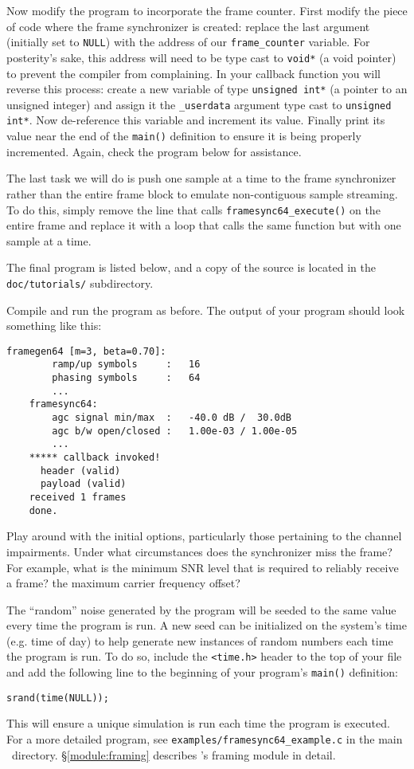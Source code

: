 Now modify the program to incorporate the frame counter.
First modify the piece of code where the frame synchronizer is created:
replace the last argument (initially set to {\tt NULL}) with the address
of our {\tt frame\_counter} variable.
For posterity's sake, this address will need to be type cast to
{\tt void*} (a void pointer) to prevent the compiler from complaining.
In your callback function you will reverse this process:
create a new variable of type {\tt unsigned int*}
(a pointer to an unsigned integer)
and assign it the {\tt \_userdata} argument type cast to
{\tt unsigned int*}.
Now de-reference this variable and increment its value.
Finally print its value near the end of the {\tt main()} definition to
ensure it is being properly incremented.
Again, check the program below for assistance.

The last task we will do is push one sample at a time to the frame
synchronizer rather than the entire frame block to emulate
non-contiguous sample streaming.
To do this, simply remove the line that calls
{\tt framesync64\_execute()} on the entire frame
and replace it with a loop that calls the same function but with one
sample at a time.

The final program is listed below,
and a copy of the source is located in the {\tt doc/tutorials/}
subdirectory.
%

%
Compile and run the program as before.
The output of your program should look something like this:
%
\begin{Verbatim}[fontsize=\small]
    framegen64 [m=3, beta=0.70]:
        ramp/up symbols     :   16
        phasing symbols     :   64
        ...
    framesync64:
        agc signal min/max  :   -40.0 dB /  30.0dB
        agc b/w open/closed :   1.00e-03 / 1.00e-05
        ...
    ***** callback invoked!
      header (valid)
      payload (valid)
    received 1 frames
    done.
\end{Verbatim}
%
Play around with the initial options, particularly those pertaining to
the channel impairments.
Under what circumstances does the synchronizer miss the frame?
For example, what is the minimum SNR level that is required to reliably
receive a frame?
the maximum carrier frequency offset?

The ``random'' noise generated by the program will be seeded to the same
value every time the program is run.
A new seed can be initialized on the system's time (e.g. time of day) to
help generate new instances of random numbers each time the program is
run.
To do so, include the {\tt <time.h>} header to the top of your file and
add the following line to the beginning of your program's {\tt main()}
definition:
%
\begin{Verbatim}[fontsize=\small]
    srand(time(NULL));
\end{Verbatim}
%
This will ensure a unique simulation is run each time the program is
executed.
For a more detailed program, see {\tt examples/framesync64\_example.c}
in the main \liquid\ directory.
\S\ref{module:framing} describes \liquid's framing module in
detail.


